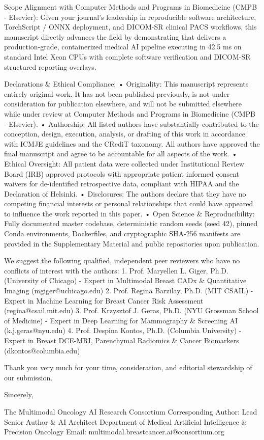 \documentclass[11pt]{article}
\begin{document}
Scope Alignment with Computer Methods and Programs in Biomedicine (CMPB - Elsevier):
Given your journal's leadership in reproducible software architecture, TorchScript / ONNX deployment, and DICOM-SR clinical PACS workflows, this manuscript directly advances the field by demonstrating that delivers a production-grade, containerized medical AI pipeline executing in 42.5 ms on standard Intel Xeon CPUs with complete software verification and DICOM-SR structured reporting overlays.

Declarations \& Ethical Compliance:
• Originality: This manuscript represents entirely original work. It has not been published previously, is not under consideration for publication elsewhere, and will not be submitted elsewhere while under review at Computer Methods and Programs in Biomedicine (CMPB - Elsevier).
• Authorship: All listed authors have substantially contributed to the conception, design, execution, analysis, or drafting of this work in accordance with ICMJE guidelines and the CRediT taxonomy. All authors have approved the final manuscript and agree to be accountable for all aspects of the work.
• Ethical Oversight: All patient data were collected under Institutional Review Board (IRB) approved protocols with appropriate patient informed consent waivers for de-identified retrospective data, compliant with HIPAA and the Declaration of Helsinki.
• Disclosures: The authors declare that they have no competing financial interests or personal relationships that could have appeared to influence the work reported in this paper.
• Open Science \& Reproducibility: Fully documented master codebase, deterministic random seeds (seed 42), pinned Conda environments, Dockerfiles, and cryptographic SHA-256 manifests are provided in the Supplementary Material and public repositories upon publication.

We suggest the following qualified, independent peer reviewers who have no conflicts of interest with the authors:
1. Prof. Maryellen L. Giger, Ph.D. (University of Chicago) - Expert in Multimodal Breast CADx \& Quantitative Imaging (mgiger@uchicago.edu)
2. Prof. Regina Barzilay, Ph.D. (MIT CSAIL) - Expert in Machine Learning for Breast Cancer Risk Assessment (regina@csail.mit.edu)
3. Prof. Krzysztof J. Geras, Ph.D. (NYU Grossman School of Medicine) - Expert in Deep Learning for Mammography \& Screening AI (k.j.geras@nyu.edu)
4. Prof. Despina Kontos, Ph.D. (Columbia University) - Expert in Breast DCE-MRI, Parenchymal Radiomics \& Cancer Biomarkers (dkontos@columbia.edu)

Thank you very much for your time, consideration, and editorial stewardship of our submission.

Sincerely,

The Multimodal Oncology AI Research Consortium
Corresponding Author: Lead Senior Author \& AI Architect
Department of Medical Artificial Intelligence \& Precision Oncology
Email: multimodal.breastcancer.ai@consortium.org
\end{document}

